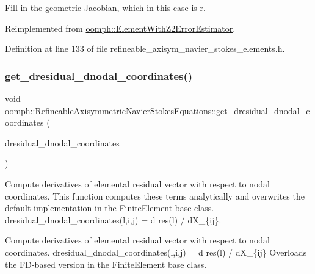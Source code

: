 Fill in the geometric Jacobian, which in this case is r. 



Reimplemented from \hyperlink{classoomph_1_1ElementWithZ2ErrorEstimator_ad2add457436f34d0d4b9e48900be309c}{oomph\+::\+Element\+With\+Z2\+Error\+Estimator}.



Definition at line 133 of file refineable\+\_\+axisym\+\_\+navier\+\_\+stokes\+\_\+elements.\+h.

\mbox{\label{classoomph_1_1RefineableAxisymmetricNavierStokesEquations_ab790c42884b501ba2d6d58f92eb26a6a}} 
\subsubsection{\texorpdfstring{get\+\_\+dresidual\+\_\+dnodal\+\_\+coordinates()}{get\_dresidual\_dnodal\_coordinates()}}
{\footnotesize\ttfamily void oomph\+::\+Refineable\+Axisymmetric\+Navier\+Stokes\+Equations\+::get\+\_\+dresidual\+\_\+dnodal\+\_\+coordinates (\begin{DoxyParamCaption}\item[{\hyperlink{classoomph_1_1RankThreeTensor}{Rank\+Three\+Tensor}$<$ double $>$ \&}]{dresidual\+\_\+dnodal\+\_\+coordinates }\end{DoxyParamCaption})\hspace{0.3cm}{\ttfamily [virtual]}}



Compute derivatives of elemental residual vector with respect to nodal coordinates. This function computes these terms analytically and overwrites the default implementation in the \hyperlink{classoomph_1_1FiniteElement}{Finite\+Element} base class. dresidual\+\_\+dnodal\+\_\+coordinates(l,i,j) = d res(l) / d\+X\+\_\+\{ij\}. 

Compute derivatives of elemental residual vector with respect to nodal coordinates. dresidual\+\_\+dnodal\+\_\+coordinates(l,i,j) = d res(l) / d\+X\+\_\+\{ij\} Overloads the F\+D-\/based version in the \hyperlink{classoomph_1_1FiniteElement}{Finite\+Element} base class. 

